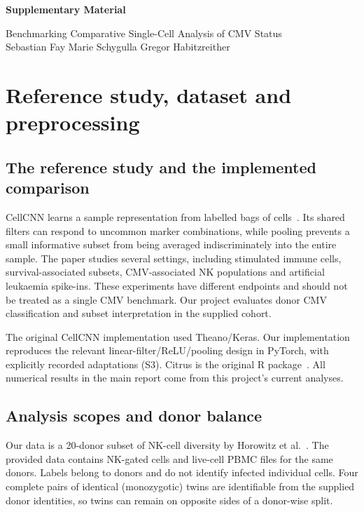 \documentclass[11pt,a4paper]{article}
\begin{document}
\begin{center}
{\Large\bfseries Supplementary Material\par}
\vspace{3pt}
Benchmarking Comparative Single-Cell Analysis of CMV Status\\
Sebastian Fay \quad Marie Schygulla \quad Gregor Habitzreither
\end{center}

\section{Reference study, dataset and preprocessing}
\subsection{The reference study and the implemented comparison}
CellCNN learns a sample representation from labelled bags of cells~\cite{cellcnn}. Its shared filters can respond to uncommon marker combinations, while pooling prevents a small informative subset from being averaged indiscriminately into the entire sample. The paper studies several settings, including stimulated immune cells, survival-associated subsets, CMV-associated NK populations and artificial leukaemia spike-ins. These experiments have different endpoints and should not be treated as a single CMV benchmark. Our project evaluates donor CMV classification and subset interpretation in the supplied cohort.

The original CellCNN implementation used Theano/Keras. Our implementation reproduces the relevant linear-filter/ReLU/pooling design in PyTorch, with explicitly recorded adaptations (S3). Citrus is the original R package~\cite{citrus}. All numerical results in the main report come from this project's current analyses.

\subsection{Analysis scopes and donor balance}
Our data is a 20-donor subset of NK-cell diversity by Horowitz et al.~\cite{horowitz}. The provided data contains NK-gated cells and live-cell PBMC files for the same donors. Labels belong to donors and do not identify infected individual cells. Four complete pairs of identical (monozygotic) twins are identifiable from the supplied donor identities, so twins can remain on opposite sides of a donor-wise split.
\end{document}
